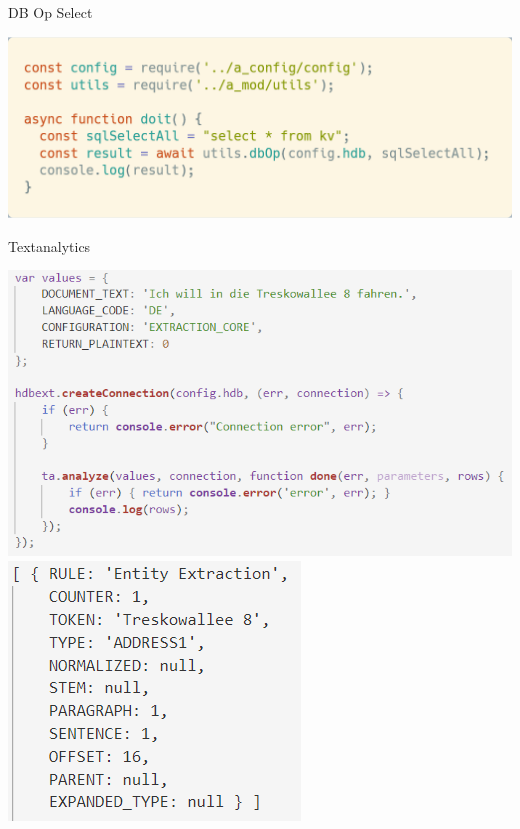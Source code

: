 \documentclass[t,handout]{beamer}
\begin{document}
\begin{frame}{DB Op Select}
  \begin{center}
    \includegraphics[scale=.24]{fig/db-op-select.png}
  \end{center}
\end{frame}

\begin{frame}{Textanalytics}
  \begin{center}
    \includegraphics[scale=.45]{fig/ta1.png}\hspace*{.2cm}
    \includegraphics[scale=.45]{fig/ta2.png}
  \end{center}
\end{frame}
\end{document}
